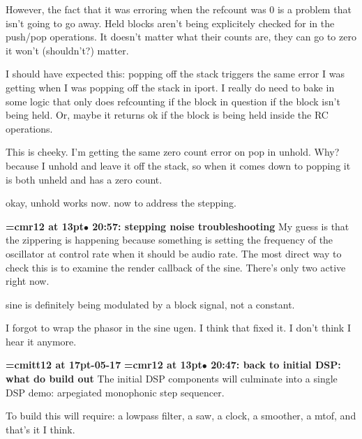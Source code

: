 However, the fact that it was erroring when the refcount was 0 is a problem that isn't going to go away. Held blocks aren't being explicitely checked for in the push/pop operations. It doesn't matter what their counts are, they can go to zero it won't (shouldn't?) matter.
\par

I should have expected this: popping off the stack triggers the same error I was getting when I was popping off the stack in iport. I really do need to bake in some logic that only does refcounting if the block in question if the block isn't being held. Or, maybe it returns ok if the block is being held inside the RC operations.
\par

This is cheeky. I'm getting the same zero count error on pop in unhold. Why? because I unhold and leave it off the stack, so when it comes down to popping it is both unheld and has a zero count.
\par

okay, unhold works now. now to address the stepping.
\par

{\smallskip\noindent\bf\font\titlefont=cmr12 at 13pt\titlefont $\bullet$ 20:57: stepping noise troubleshooting}\smallskip
My guess is that the zippering is happening because something is setting the frequency of the oscillator at control rate when it should be audio rate. The most direct way to check this is to examine the render callback of the sine. There's only two active right now.
\par

sine is definitely being modulated by a block signal, not a constant.
\par

I forgot to wrap the phasor in the sine ugen. I think that fixed it. I don't think I hear it anymore.
\par

{\medskip\noindent\bf\font\titlefont=cmitt12 at 17pt-05-17}\medskip
{\smallskip\noindent\bf\font\titlefont=cmr12 at 13pt\titlefont $\bullet$ 20:47: back to initial DSP: what do build out}\smallskip
The initial DSP components will culminate into a single DSP demo: arpegiated monophonic step sequencer.
\par

To build this will require: a lowpass filter, a saw, a clock, a smoother, a mtof, and that's it I think.
\par

